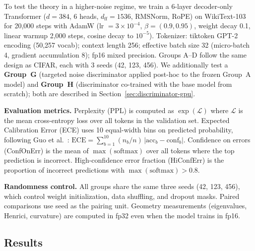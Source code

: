 \documentclass[11pt,a4paper]{article}
\theoremstyle{definition}
\begin{document}
To test the theory in a higher-noise regime, we train a 6-layer
decoder-only Transformer ($d = 384$, 6 heads, $d_{\mathrm{ff}} = 1536$,
RMSNorm, RoPE) on
WikiText-103 for 20{,}000 steps with AdamW (lr $= 3 \times 10^{-4}$,
$\beta = (0.9, 0.95)$, weight decay 0.1, linear warmup 2{,}000
steps, cosine decay to $10^{-5}$). Tokenizer: tiktoken GPT-2
encoding (50{,}257 vocab); context length 256; effective batch size
32 (micro-batch 4, gradient accumulation 8); fp16 mixed precision.
Groups A--D follow the same design as CIFAR, each with 3 seeds
(42, 123, 456). We additionally test a \textbf{Group~G}
(targeted noise discriminator applied post-hoc to the frozen
Group~A model) and \textbf{Group~H} (discriminator co-trained
with the base model from scratch); both are described in
Section~\ref{sec:discriminator-gpu}.

\textbf{Evaluation metrics.}
Perplexity (PPL) is computed as $\exp(\mathcal{L})$ where
$\mathcal{L}$ is the mean cross-entropy loss over all tokens in the
validation set.
Expected Calibration Error (ECE) uses 10 equal-width bins on
predicted probability, following Guo et al.~\cite{guo2017calibration}:
$\mathrm{ECE} = \sum_{b=1}^{10}(n_b/n)\,|\mathrm{acc}_b -
\mathrm{conf}_b|$.
Confidence on errors (ConfOnErr) is the mean of
$\max(\mathrm{softmax})$ over all tokens where the top prediction
is incorrect.
High-confidence error fraction (HiConfErr) is the proportion of
incorrect predictions with $\max(\mathrm{softmax}) > 0.8$.

\textbf{Randomness control.} All groups share the same three seeds
(42, 123, 456), which control weight initialization, data shuffling,
and dropout masks. Paired comparisons use seed as the pairing unit.
Geometry measurements (eigenvalues, Henrici, curvature) are computed
in fp32 even when the model trains in fp16.

\subsection{Results}
\end{document}
